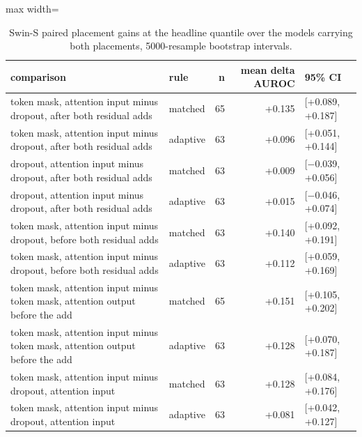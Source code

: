 \begin{table}[htbp]
\centering
\small
\caption{Swin-S paired placement gains at the headline quantile over the models carrying both placements, 5000-resample bootstrap intervals.}
\label{tab:swin-gains}
\begin{adjustbox}{max width=\linewidth}
\begin{tabular}{llrrl}
\toprule
comparison & rule & n & mean delta AUROC & 95\% CI \\
\midrule
token mask, attention input minus dropout, after both residual adds & matched & 65 & +0.135 & [+0.089, +0.187] \\
token mask, attention input minus dropout, after both residual adds & adaptive & 63 & +0.096 & [+0.051, +0.144] \\
dropout, attention input minus dropout, after both residual adds & matched & 63 & +0.009 & [$-$0.039, +0.056] \\
dropout, attention input minus dropout, after both residual adds & adaptive & 63 & +0.015 & [$-$0.046, +0.074] \\
token mask, attention input minus dropout, before both residual adds & matched & 63 & +0.140 & [+0.092, +0.191] \\
token mask, attention input minus dropout, before both residual adds & adaptive & 63 & +0.112 & [+0.059, +0.169] \\
token mask, attention input minus token mask, attention output before the add & matched & 65 & +0.151 & [+0.105, +0.202] \\
token mask, attention input minus token mask, attention output before the add & adaptive & 63 & +0.128 & [+0.070, +0.187] \\
token mask, attention input minus dropout, attention input & matched & 63 & +0.128 & [+0.084, +0.176] \\
token mask, attention input minus dropout, attention input & adaptive & 63 & +0.081 & [+0.042, +0.127] \\
\bottomrule
\end{tabular}
\end{adjustbox}
\end{table}
